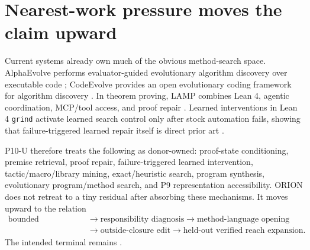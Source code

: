\section{Nearest-work pressure moves the claim upward}
Current systems already own much of the obvious method-search space. AlphaEvolve performs evaluator-guided evolutionary algorithm discovery over executable code \cite{alphaevolve2025}; CodeEvolve provides an open evolutionary coding framework for algorithm discovery \cite{codeevolve2025}. In theorem proving, LAMP combines Lean 4, agentic coordination, MCP/tool access, and proof repair \cite{lamp2026}. Learned interventions in Lean 4 \texttt{grind} activate learned search control only after stock automation fails, showing that failure-triggered learned repair itself is direct prior art \cite{grind2026}.

P10-U therefore treats the following as donor-owned: proof-state conditioning, premise retrieval, proof repair, failure-triggered learned intervention, tactic/macro/library mining, exact/heuristic search, program synthesis, evolutionary program/method search, and P9 representation accessibility. ORION does not retreat to a tiny residual after absorbing these mechanisms. It moves upward to the relation
\[
\begin{aligned}
\text{bounded obstruction}
  &\to\text{responsibility diagnosis}
  \to\text{method-language opening}\\
  &\to\text{outside-closure edit}
  \to\text{held-out verified reach expansion}.
\end{aligned}
\]
The intended terminal remains
\textbf{}.
